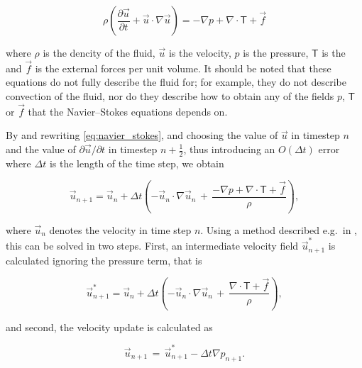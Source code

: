 \begin{equation} \label{eq:navier_stokes}
\rho\left(\frac{\partial\vec{u}}{\partial t} + \vec{u}\cdot\nabla\vec{u}\right) = -\nabla p + \nabla\cdot\boldsymbol{\mathsf{T}} + \vec{f}
\end{equation}

where $\rho$ is the dencity of the fluid, $\vec{u}$ is the velocity, $p$ is the pressure, $\boldsymbol{\mathsf{T}}$ is the  and $\vec{f}$ is the external forces per unit volume. It should be noted that these equations do not fully describe the fluid for; for example, they do not describe convection of the fluid, nor do they describe how to obtain any of the fields $p$, $\boldsymbol{\mathsf{T}}$ or $\vec{f}$ that the Navier--Stokes equations depends on.

By  and rewriting \eqref{eq:navier_stokes}, and choosing the value of $\vec{u}$ in timestep $n$ and the value of $\partial\vec{u}/\partial t$ in timestep $n+\frac{1}{2}$, thus introducing an $O(\Delta t)$ error where $\Delta t$ is the length of the time step, we obtain

\begin{equation} \label{eq:navier_stokes_time_discretized}
\vec{u}_{n+1}  = \vec{u}_{n} + \Delta t\left(-\vec{u}_{n}\cdot\nabla\vec{u}_{n} \,+\, \frac{-\nabla p + \nabla\cdot\boldsymbol{\mathsf{T}} + \vec{f}}{\rho}\right),
\end{equation}

where $\vec{u}_{n}$ denotes the velocity in time step $n$. Using a method described e.g.\ in \citep{Losasso2004}, this \PDE can be solved in two steps. First, an intermediate velocity field $\vec{u}^*_{n+1}$ is calculated ignoring the pressure term, that is

\begin{equation} \label{eq:intermediate_velocity}
\vec{u}^*_{n+1}  = \vec{u}_{n} + \Delta t\left(-\vec{u}_{n}\cdot\nabla\vec{u}_{n} \,+\, \frac{\nabla\cdot\boldsymbol{\mathsf{T}} + \vec{f}}{\rho}\right),
\end{equation}

and second, the velocity update is calculated as

\begin{equation} \label{eq:velocity_update}
\vec{u}_{n+1} \,=\, \vec{u}^*_{n+1} - \Delta t\nabla p_{n+1}.
\end{equation}


